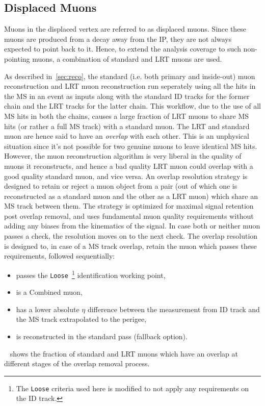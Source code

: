 \subsection{Displaced Muons}
Muons in the displaced vertex are referred to as displaced muons. Since these muons are produced from a decay away from the IP, they are not always expected to point back to it. Hence, to extend the analysis coverage to such non-pointing muons, a combination of standard and LRT muons are used.

As described in~\cref{sec:reco}, the standard (i.e. both primary and inside-out) muon reconstruction and LRT muon reconstruction run seperately using all the hits in the MS in an event as inputs along with the standard ID tracks for the former chain and the LRT tracks for the latter chain. This workflow, due to the use of all MS hits in both the chains, causes a large fraction of LRT muons to share MS hits (or rather a full MS track) with a standard muon. The LRT and standard muon are hence said to have an \textit{overlap} with each other. This is an unphysical situation since it's not possible for two genuine muons to leave identical MS hits. However, the muon reconstruction algorithm is very liberal in the quality of muons it reconstructs, and hence a bad quality LRT muon could overlap with a good quality standard muon, and vice versa. An overlap resolution strategy is designed to retain or reject a muon object from a pair (out of which one is reconstructed as a standard muon and the other as a LRT muon) which share an MS track between them. The strategy is optimized for maximal signal retention post overlap removal, and uses fundamental muon quality requirements without adding any biases from the kinematics of the signal. In case both or neither muon passes a check, the resolution moves on to the next check. The overlap resolution is designed to, in case of a MS track overlap, retain the muon which passes these requirements, followed sequentially:
\begin{itemize}
    \item passes the \texttt{Loose}~\cite{MUON-2018-03}\footnote{The \texttt{Loose} criteria used here is modified to not apply any requirements on the ID track.} identification working point,
    \item is a Combined muon,
    \item has a lower absolute $\eta$ difference between the measurement from ID track and the MS track extrapolated to the perigee,
    \item is reconstructed in the standard pass (fallback option).
\end{itemize}
~ shows the fraction of standard and LRT muons which have an overlap at different stages of the overlap removal process.

